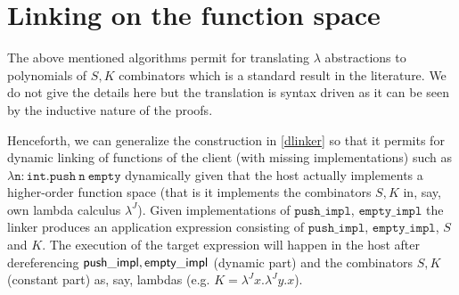 \section{Linking on the function space}
The above mentioned algorithms permit  for translating $\lambda$ abstractions to polynomials of $S,K$ combinators which is a standard result in the literature. We do not give the details here but the translation is  syntax driven as it can be seen by the inductive nature of the proofs.

Henceforth, we can generalize the construction in \ref{dlinker} so that it permits for dynamic linking of functions of the client (with missing implementations) such as  $\mathtt{\lambda n:int. push\  n\  empty}$ dynamically given that the host actually implements a higher-order function space (that is it implements the combinators $S,K$ in, say, own lambda calculus $\lambda^{J}$). Given implementations of $\mathtt{push\_impl}$, $\mathtt{empty\_impl}$ the linker produces an application expression consisting of $\mathtt{push\_impl}$, $\mathtt{empty\_impl}$, $S$ and $K$.   The execution of the target expression will happen in the host after dereferencing  ${\sf push\_impl, empty\_impl}$ (dynamic part) and the combinators $S,K$ (constant part) as, say, lambdas (e.g. $K=\lambda^{J} x.\lambda^{J} y. x$).

